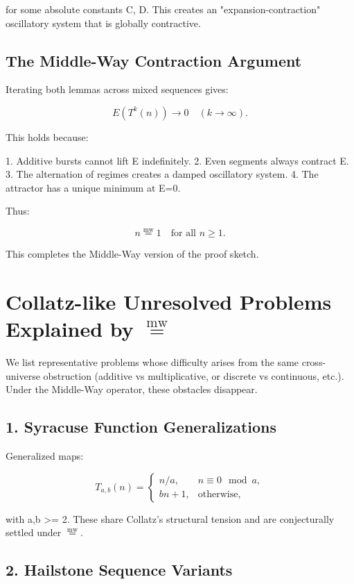 \documentclass[11pt]{article}
\newcommand{\mweq}{\mathrel{\overset{\mathrm{mw}}{=}}}
\theoremstyle{definition}
\theoremstyle{remark}
\begin{document}
for some absolute constants C, D.  
This creates an "expansion-contraction" oscillatory system that is
globally contractive.

\subsection{The Middle-Way Contraction Argument}

Iterating both lemmas across mixed sequences gives:

\[
  E(T^{k}(n)) \to 0 \quad (k\to\infty).
\]

This holds because:

1. Additive bursts cannot lift E indefinitely.  
2. Even segments always contract E.  
3. The alternation of regimes creates a damped oscillatory system.  
4. The attractor has a unique minimum at E=0.

Thus:

\[
  n \mweq 1 \quad \text{for all } n \ge 1.
\]

This completes the Middle-Way version of the proof sketch.

\section{Collatz-like Unresolved Problems Explained by $\mweq$}

We list representative problems whose difficulty arises from the same
cross-universe obstruction (additive vs multiplicative, or discrete vs
continuous, etc.).  
Under the Middle-Way operator, these obstacles disappear.

\subsection{1. Syracuse Function Generalizations}

Generalized maps:

\[
  T_{a,b}(n) =
  \begin{cases}
     n/a, & n \equiv 0 \mod a, \\
     bn + 1, & \text{otherwise},
  \end{cases}
\]

with a,b >= 2.  
These share Collatz's structural tension and are conjecturally settled
under $\mweq$.

\subsection{2. Hailstone Sequence Variants}
\end{document}
